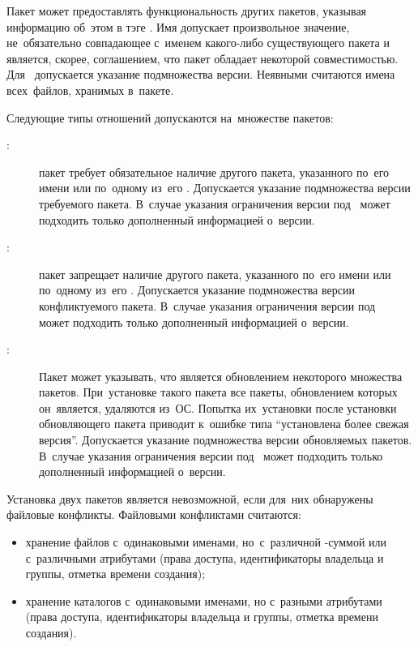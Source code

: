Пакет может предоставлять функциональность других пакетов,
указывая информацию об~этом в тэге .
Имя  допускает произвольное значение, не~обязательно совпадающее с~именем какого-либо существующего пакета
и является, скорее, соглашением, что пакет обладает некоторой совместимостью.
Для~  допускается указание подмножества версии.
Неявными  считаются имена всех~файлов, хранимых в~пакете.

Следующие типы отношений допускаются на~множестве пакетов:

\begin{description}

\item[:]
пакет требует обязательное наличие другого пакета, указанного по~его имени или по~одному из~его .
Допускается указание подмножества версии требуемого пакета.
В~случае указания ограничения версии под~ может подходить  только дополненный информацией о~версии.

\item[:]
пакет запрещает наличие другого пакета, указанного по~его имени или по~одному из~его .
Допускается указание подмножества версии конфликтуемого пакета.
В~случае указания ограничения версии под~ может подходить  только дополненный информацией о~версии.

\item[:]
Пакет может указывать, что является обновлением некоторого множества пакетов.
При~установке такого пакета все пакеты, обновлением которых он~является, удаляются из~ОС.
Попытка их~установки после установки обновляющего пакета приводит к~ошибке типа ``установлена более свежая версия''.
Допускается указание подмножества версии обновляемых пакетов.
В~случае указания ограничения версии под~ может подходить  только дополненный информацией о~версии.

\end{description}

Установка двух пакетов является невозможной, если для~них обнаружены файловые конфликты.
Файловыми конфликтами считаются:

\begin{itemize}

\item {
хранение файлов с~одинаковыми именами, но~с~различной -суммой или с~различными атрибутами 
(права доступа, идентификаторы владельца и группы, отметка времени создания);
}

\item {
хранение каталогов с~одинаковыми именами, но с~разными атрибутами 
(права доступа, идентификаторы владельца и группы, отметка времени создания).
}

\end{itemize}

